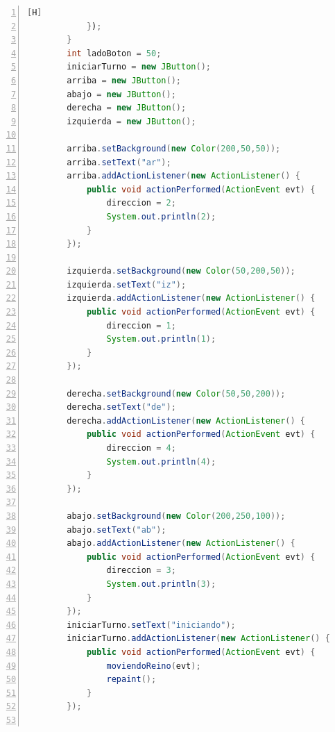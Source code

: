 \documentclass{article}
\begin{document}
\begin{lstlisting}[language=Java,caption={Creando la interfaz de tablero},numbers=left,][H]
            });
        }
        int ladoBoton = 50;
        iniciarTurno = new JButton();
        arriba = new JButton();
        abajo = new JButton();
        derecha = new JButton();
        izquierda = new JButton();

        arriba.setBackground(new Color(200,50,50));
        arriba.setText("ar");
        arriba.addActionListener(new ActionListener() {
            public void actionPerformed(ActionEvent evt) {
                direccion = 2;
                System.out.println(2);
            }
        });

        izquierda.setBackground(new Color(50,200,50));
        izquierda.setText("iz");
        izquierda.addActionListener(new ActionListener() {
            public void actionPerformed(ActionEvent evt) {
                direccion = 1;
                System.out.println(1);
            }
        });

        derecha.setBackground(new Color(50,50,200));
        derecha.setText("de");
        derecha.addActionListener(new ActionListener() {
            public void actionPerformed(ActionEvent evt) {
                direccion = 4;
                System.out.println(4);
            }
        });

        abajo.setBackground(new Color(200,250,100));
        abajo.setText("ab");
        abajo.addActionListener(new ActionListener() {
            public void actionPerformed(ActionEvent evt) {
                direccion = 3;
                System.out.println(3);
            }
        });
        iniciarTurno.setText("iniciando");
        iniciarTurno.addActionListener(new ActionListener() {
            public void actionPerformed(ActionEvent evt) {
                moviendoReino(evt);
                repaint();
            }
        });


\end{lstlisting}
\end{document}
